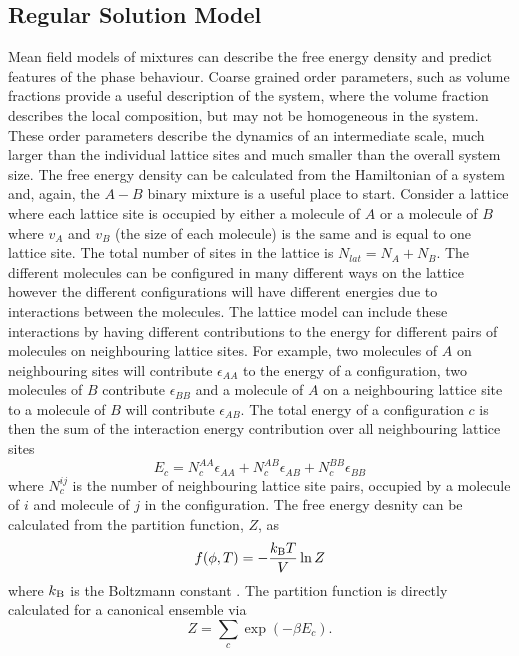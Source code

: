 \subsection{Regular Solution Model}
Mean field models of mixtures can describe the free energy density and predict features of the phase behaviour. Coarse grained order parameters, such as volume fractions provide a useful description of the system, where the volume fraction describes the local  composition, but may not be homogeneous in the system. These order parameters describe the dynamics of an intermediate scale, much larger than the individual lattice sites and much smaller than the overall system size.
The free energy density can be calculated from the Hamiltonian of a system and, again, the $A-B$ binary mixture is a useful place to start. Consider a lattice where each lattice site is occupied by either a molecule of $A$ or a molecule of $B$ where $v_A$ and $v_B$ (the size of each molecule) is the same and is equal to one lattice site. The total number of sites in the lattice  is $N_{lat} = N_A + N_B$. The different molecules can be configured in many different ways on the lattice however the different configurations will have different energies due to interactions between the molecules. The lattice model can include these interactions by having different contributions to the energy for different pairs of molecules on neighbouring lattice sites. For example, two molecules of $A$ on neighbouring sites will contribute $\epsilon_{AA}$ to the energy of a configuration, two molecules of $B$ contribute $\epsilon_{BB}$ and a molecule of $A$ on a neighbouring lattice site to a molecule of $B$ will contribute $\epsilon_{AB}$. The total energy of a configuration $c$ is then the sum of the interaction energy contribution over all neighbouring lattice sites
\begin{equation}
    E_{c} = N_c^{AA}\epsilon_{AA} + N_c^{AB}\epsilon_{AB} + N_c^{BB}\epsilon_{BB}
\end{equation}
where $N_c^{ij}$ is the number of neighbouring lattice site pairs, occupied by a molecule of $i$ and molecule of $j$ in the configuration. The free energy desnity can be calculated from the partition function, $Z$, as
\begin{equation}
    f(\phi, T) = -\frac{k_{\rm B} T}{V}\ln Z
    \label{eq:2-f_ln}
\end{equation}
where $k_{\rm B}$ is the Boltzmann constant \cite{kardar2007statistical}. The partition function is directly calculated for a canonical ensemble via
\begin{equation}
    Z = \sum_c \exp{(-\beta E_c)}.
\end{equation}
